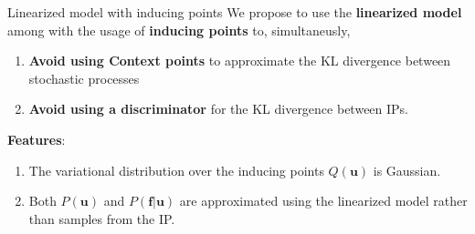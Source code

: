 
    \begin{frame}{Linearized model with inducing points}
        We propose to use the \textbf{\alert{linearized model}} among with the usage of \textbf{\alert{inducing points}} to, simultaneusly,
        \begin{enumerate}
            \item \textbf{Avoid using Context points} to approximate the KL divergence between stochastic processes
            \item \textbf{Avoid using a discriminator} for the KL divergence between IPs.
        \end{enumerate}

        \textbf{Features}:
        \begin{enumerate}
            \item The variational distribution over the inducing points \(Q(\bm u)\) is Gaussian.
            \item Both \(P(\bm u)\) and \(P(\mathbf f| \bm u)\) are approximated using the linearized model rather than samples from the IP.
        \end{enumerate}
    \end{frame}

